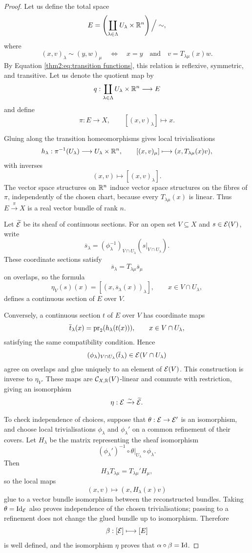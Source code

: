 \documentclass[12pt,a4paper]{article}
\begin{document}
\begin{proof}
Let us define the total space
\[
    E=
    \left(
        \coprod_{\lambda\in\Lambda}U_\lambda\times\mathbb{R}^n
    \right)\Big/\sim,
\]
where
\[
    (x,v)_\lambda\sim(y,w)_\mu
    \quad\Longleftrightarrow\quad
    x=y
    \quad\text{and}\quad
    v=T_{\lambda\mu}(x)w.
\]
By Equation \ref{thm2:eq:transition functions}, this relation is reflexive, symmetric, and transitive. Let us denote the quotient map by
\[
    q:\coprod_{\lambda\in\Lambda}U_\lambda\times\mathbb{R}^n
    \longrightarrow E
\]
and define
\[
    \pi:E\longrightarrow X,
    \qquad
    [(x,v)_\lambda]\longmapsto x.
\]

Gluing along the transition homeomorphisms gives local
trivialisations
\[
    h_\lambda:\pi^{-1}(U_\lambda)
    \longrightarrow U_\lambda\times\mathbb{R}^n,
    \qquad
    [(x,v)_\mu]\longmapsto(x,T_{\lambda\mu}(x)v),
\]
with inverses
\[
    (x,v)\longmapsto[(x,v)_\lambda].
\]
The vector space structures on $\mathbb{R}^n$ induce vector space
structures on the fibres of $\pi$, independently of the
chosen chart, because every $T_{\lambda\mu}(x)$ is linear.
Thus $E\overset{\pi}\to X$ is a real vector bundle of rank $n$.

Let $\widetilde{\mathcal{E}}$ be its sheaf of continuous sections.
For an open set $V\subseteq X$ and $s\in\mathcal{E}(V)$, write
\[
    \overline s_\lambda
    =
    (\phi_\lambda^{-1})_{V\cap U_\lambda}
    (s|_{V\cap U_\lambda}).
\]
These coordinate sections satisfy
\[
    \overline s_\lambda
    =
    T_{\lambda\mu}\overline s_\mu
\]
on overlaps, so the formula
\[
    \eta_V(s)(x)
    =
    [(x,\overline s_\lambda(x))_\lambda],
    \qquad x\in V\cap U_\lambda,
\]
defines a continuous section of $E$ over $V$.

Conversely, a continuous section $t$ of $E$ over $V$ has
coordinate maps
\[
    \overline t_\lambda(x)=\operatorname{pr}_2(h_\lambda(t(x))),
    \qquad x\in V\cap U_\lambda,
\]
satisfying the same compatibility condition. Hence
\[
    (\phi_\lambda)_{V\cap U_\lambda}(\overline t_\lambda)
    \in\mathcal{E}(V\cap U_\lambda)
\]
agree on overlaps and glue uniquely to an element of $\mathcal{E}(V)$.
This construction is inverse to $\eta_V$. These maps are
$\mathcal{C}_{X,\mathbb{R}}(V)$-linear and commute with restriction, giving
an isomorphism
\[
    \eta:\mathcal{E}\xrightarrow{\sim}\widetilde{\mathcal{E}}.
\]

To check independence of choices, suppose that
$\theta:\mathcal{E}\to\mathcal{E}'$ is an isomorphism, and choose local
trivialisations $\phi_\lambda$ and $\phi_\lambda'$ on a
common refinement of their covers. Let $H_\lambda$ be
the matrix representing the sheaf isomorphism
\[
    (\phi_\lambda')^{-1}
    \circ\theta|_{U_\lambda}\circ\phi_\lambda.
\]
Then
\[
    H_\lambda T_{\lambda\mu}
    =
    T_{\lambda\mu}'H_\mu,
\]
so the local maps
\[
    (x,v)\longmapsto(x,H_\lambda(x)v)
\]
glue to a vector bundle isomorphism between the reconstructed
bundles. Taking $\theta=\operatorname{Id}_{\mathcal{E}}$ also proves independence
of the chosen trivialisations; passing to a refinement
does not change the glued bundle up to isomorphism.
Therefore
\[
    \beta:[\mathcal{E}]\longmapsto[E]
\]
is well defined, and the isomorphism $\eta$ proves that
$\alpha\circ\beta=\operatorname{Id}$.


\end{proof}
\end{document}

